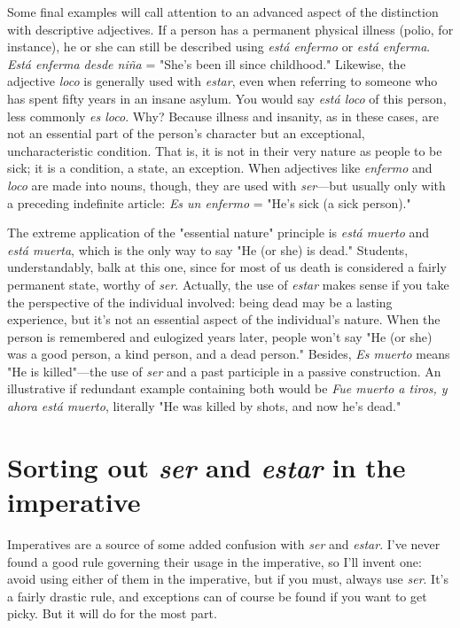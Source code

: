 \documentclass[14pt,a4paper,oneside]{memoir}
\begin{document}
Some final examples will call attention to an advanced aspect
of the distinction with descriptive adjectives. If a person has a permanent physical illness (polio, for instance), he or she can still be described using \emph{está enfermo} or \emph{está enferma}. \emph{Está enferma desde niña} =
"She's been ill since childhood." Likewise, the adjective \emph{loco} is generally used with \emph{estar}, even when referring to someone who has spent
fifty years in an insane asylum. You would say \emph{está loco} of this person,
less commonly \emph{es loco}. Why? Because illness and insanity, as in these
cases, are not an essential part of the person's character but an exceptional, uncharacteristic condition. That is, it is not in their very nature
as people to be sick; it is a condition, a state, an exception. When adjectives like \emph{enfermo} and \emph{loco} are made into nouns, though, they are
used with \emph{ser}---but usually only with a preceding indefinite article: \emph{Es
un enfermo} = "He's sick (a sick person)."

The extreme application of the "essential nature" principle is
\emph{está muerto} and \emph{está muerta}, which is the only way to say "He (or
she) is dead." Students, understandably, balk at this one, since for most
of us death is considered a fairly permanent state, worthy of \emph{ser}. Actually, the use of \emph{estar} makes sense if you take the perspective of the
individual involved: being dead may be a lasting experience, but it's
not an essential aspect of the individual's nature. When the person is
remembered and eulogized years later, people won't say "He (or she)
was a good person, a kind person, and a dead person." Besides, \emph{Es
muerto} means "He is killed"---the use of \emph{ser} and a past participle in a
passive construction. An illustrative if redundant example containing
both would be \emph{Fue muerto a tiros, y ahora está muerto}, literally "He
was killed by shots, and now he's dead."

\section{Sorting out \emph{ser} and \emph{estar} in the imperative}

Imperatives are a source of some added confusion with \emph{ser} and
\emph{estar}. I've never found a good rule governing their usage in the imperative, so I'll invent one: avoid using either of them in the imperative,
but if you must, always use \emph{ser}. It's a fairly drastic rule, and exceptions
can of course be found if you want to get picky. But it will do for the
most part.
\end{document}
